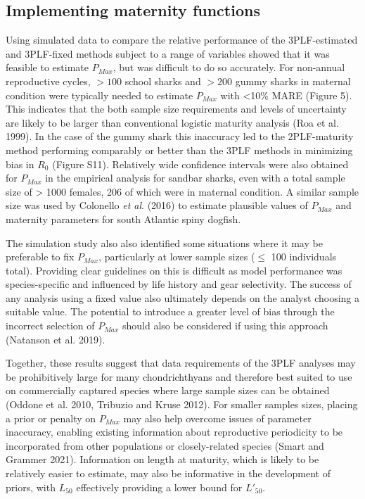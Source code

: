 \documentclass[
]{article}
\begin{document}
\subsection{Implementing maternity functions}\label{implementing-maternity-functions}

Using simulated data to compare the relative performance of the 3PLF-estimated and 3PLF-fixed methods subject to a range of variables showed that it was feasible to estimate \(P_{Max}\), but was difficult to do so accurately. For non-annual reproductive cycles, \(> 100\) school sharks and \(> 200\) gummy sharks in maternal condition were typically needed to estimate \(P_{Max}\) with \textless10\% MARE (Figure 5). This indicates that the both sample size requirements and levels of uncertainty are likely to be larger than conventional logistic maturity analysis (Roa et al. 1999). In the case of the gummy shark this inaccuracy led to the 2PLF-maturity method performing comparably or better than the 3PLF methods in minimizing bias in \(R_0\) (Figure S11). Relatively wide confidence intervals were also obtained for \(P_{Max}\) in the empirical analysis for sandbar sharks, even with a total sample size of \textgreater{} 1000 females, 206 of which were in maternal condition. A similar sample size was used by Colonello \emph{et al}. (2016) to estimate plausible values of \(P_{Max}\) and maternity parameters for south Atlantic spiny dogfish.

The simulation study also also identified some situations where it may be preferable to fix \(P_{Max}\), particularly at lower sample sizes (\(\le\) 100 individuals total). Providing clear guidelines on this is difficult as model performance was species-specific and influenced by life history and gear selectivity. The success of any analysis using a fixed value also ultimately depends on the analyst choosing a suitable value. The potential to introduce a greater level of bias through the incorrect selection of \(P_{Max}\) should also be considered if using this approach (Natanson et al. 2019).

Together, these results suggest that data requirements of the 3PLF analyses may be prohibitively large for many chondrichthyans and therefore best suited to use on commercially captured species where large sample sizes can be obtained (Oddone et al. 2010, Tribuzio and Kruse 2012). For smaller samples sizes, placing a prior or penalty on \(P_{Max}\) may also help overcome issues of parameter inaccuracy, enabling existing information about reproductive periodicity to be incorporated from other populations or closely-related species (Smart and Grammer 2021). Information on length at maturity, which is likely to be relatively easier to estimate, may also be informative in the development of priors, with \(L_{50}\) effectively providing a lower bound for \(L'_{50}\).
\end{document}
